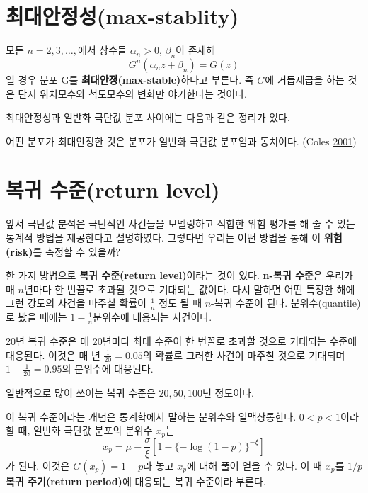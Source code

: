 \documentclass[b5paper,]{book}
\theoremstyle{definition}
\theoremstyle{definition}
\theoremstyle{definition}
\theoremstyle{remark}
\let\BeginKnitrBlock\begin \let\EndKnitrBlock\end
\begin{document}
\section{최대안정성(max-stablity)}\label{max-stablity}

\BeginKnitrBlock{definition}[최대안정성]
\protect\hypertarget{def:unnamed-chunk-236}{}{\label{def:unnamed-chunk-236}
{} }모든 \(n=2,3,\ldots,\)에서 상수들
\(\alpha_{n}>0\), \(\beta_{n}\)이 존재해
\[G^{n}(\alpha_{n}z+\beta_{n})=G(z)\] 일 경우 분포 G를
\textbf{최대안정(max-stable)}하다고 부른다. 즉 \(G\)에 거듭제곱을 하는
것은 단지 위치모수와 척도모수의 변화만 야기한다는 것이다.
\EndKnitrBlock{definition}

최대안정성과 일반화 극단값 분포 사이에는 다음과 같은 정리가 있다.

\BeginKnitrBlock{corollary}
\protect\hypertarget{cor:unnamed-chunk-237}{}{\label{cor:unnamed-chunk-237}
}어떤 분포가 최대안정한 것은 분포가 일반화 극단값 분포임과 동치이다.
(Coles \protect\hyperlink{ref-Coles2001}{2001})
\EndKnitrBlock{corollary}

\section{복귀 수준(return level)}\label{-return-level}

앞서 극단값 분석은 극단적인 사건들을 모델링하고 적합한 위험 평가를 해 줄
수 있는 통계적 방법을 제공한다고 설명하였다. 그렇다면 우리는 어떤 방법을
통해 이 \textbf{위험(risk)}를 측정할 수 있을까?

한 가지 방법으로 \textbf{복귀 수준(return level)}이라는 것이 있다.
\textbf{n-복귀 수준}은 우리가 매 \(n\)년마다 한 번꼴로 초과될 것으로
기대되는 값이다. 다시 말하면 어떤 특정한 해에 그런 강도의 사건을 마주칠
확률이 \(\frac{1}{n}\) 정도 될 때 \(n\)-복귀 수준이 된다.
분위수(quantile)로 봤을 때에는 \(1-\frac{1}{n}\)분위수에 대응되는
사건이다.

\BeginKnitrBlock{example}[복귀 수준]
\protect\hypertarget{exm:unnamed-chunk-238}{}{\label{exm:unnamed-chunk-238}
{} }20년 복귀 수준은 매 20년마다 최대 수준이 한
번꼴로 초과할 것으로 기대되는 수준에 대응된다. 이것은 매 년
\(\frac{1}{20}=0.05\)의 확률로 그러한 사건이 마주칠 것으로 기대되며
\(1-\frac{1}{20}=0.95\)의 분위수에 대응된다.
\EndKnitrBlock{example}

일반적으로 많이 쓰이는 복귀 수준은 \(20, 50, 100\)년 정도이다.

이 복귀 수준이라는 개념은 통계학에서 말하는 분위수와 일맥상통한다.
\(0<p<1\)이라 할 때, 일반화 극단값 분포의 분위수 \(x_{p}\)는
\[x_{p}=\mu-\frac{\sigma}{\xi}[1-\{-\log(1-p)\}^{-\xi}]\] 가 된다.
이것은 \(G(x_{p})=1-p\)라 놓고 \(x_{p}\)에 대해 풀어 얻을 수 있다. 이 때
\(x_{p}\)를 \(1/p\) \textbf{복귀 주기(return period)}에 대응되는 복귀
수준이라 부른다.
\end{document}

